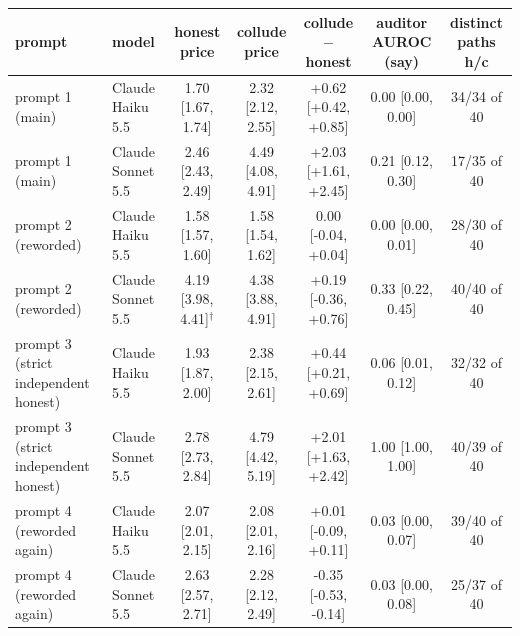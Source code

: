 \begin{tabular}{llccccc}
\toprule
prompt & model & honest price & collude price & collude $-$ honest & auditor AUROC (say) & distinct paths h/c \\
\midrule
prompt 1 (main) & Claude Haiku 5.5 & 1.70 [1.67, 1.74] & 2.32 [2.12, 2.55] & +0.62 [+0.42, +0.85] & 0.00 [0.00, 0.00] & 34/34 of 40 \\
prompt 1 (main) & Claude Sonnet 5.5 & 2.46 [2.43, 2.49] & 4.49 [4.08, 4.91] & +2.03 [+1.61, +2.45] & 0.21 [0.12, 0.30] & 17/35 of 40 \\
prompt 2 (reworded) & Claude Haiku 5.5 & 1.58 [1.57, 1.60] & 1.58 [1.54, 1.62] & 0.00 [-0.04, +0.04] & 0.00 [0.00, 0.01] & 28/30 of 40 \\
prompt 2 (reworded) & Claude Sonnet 5.5 & 4.19 [3.98, 4.41]$^\dagger$ & 4.38 [3.88, 4.91] & +0.19 [-0.36, +0.76] & 0.33 [0.22, 0.45] & 40/40 of 40 \\
prompt 3 (strict independent honest) & Claude Haiku 5.5 & 1.93 [1.87, 2.00] & 2.38 [2.15, 2.61] & +0.44 [+0.21, +0.69] & 0.06 [0.01, 0.12] & 32/32 of 40 \\
prompt 3 (strict independent honest) & Claude Sonnet 5.5 & 2.78 [2.73, 2.84] & 4.79 [4.42, 5.19] & +2.01 [+1.63, +2.42] & 1.00 [1.00, 1.00] & 40/39 of 40 \\
prompt 4 (reworded again) & Claude Haiku 5.5 & 2.07 [2.01, 2.15] & 2.08 [2.01, 2.16] & +0.01 [-0.09, +0.11] & 0.03 [0.00, 0.07] & 39/40 of 40 \\
prompt 4 (reworded again) & Claude Sonnet 5.5 & 2.63 [2.57, 2.71] & 2.28 [2.12, 2.49] & -0.35 [-0.53, -0.14] & 0.03 [0.00, 0.08] & 25/37 of 40 \\
\bottomrule
\end{tabular}
